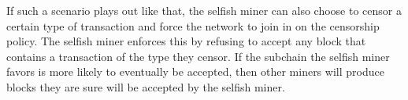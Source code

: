 If such a scenario plays out like that, the selfish miner can also choose to censor a certain type of transaction and force the network to join in on the censorship policy. The selfish miner enforces this by refusing to accept any block that contains a transaction of the type they censor. If the subchain the selfish miner favors is more likely to eventually be accepted, then other miners will produce blocks they are sure will be accepted by the selfish miner.
